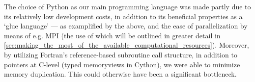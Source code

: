 The choice of Python as our main programming language was made partly due to
its relatively low development costs, in addition to its beneficial properties
as a `glue language' --- as examplified by the above, and the ease of
parallelization by means of e.g. MPI (the use of which will be outlined in
greater detail in
\cref{sec:making_the_most_of_the_available_computational_resources}).
Moreover, by utilizing Fortran's reference-based subroutine call structure, in
addition to pointers at C-level (typed memoryviews in Cython), we were able to
minimize memory duplication. This could otherwise have been a significant
bottleneck.

